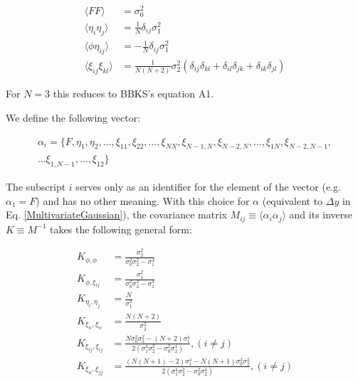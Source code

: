 \documentclass[12pt]{article}
\begin{document}

\begin{equation} \label{corr}
\begin{split}
\langle FF \rangle &= \sigma_0^2 \\
\langle\eta_i\eta_j\rangle &= \frac{1}{N}\delta_{ij}\sigma_1^2 \\
\langle\phi\eta_{ij}\rangle &= -\frac{1}{N}\delta_{ij}\sigma_1^2 \\
\langle\xi_{ij}\xi_{kl}\rangle &= \frac{1}{N(N+2)}\sigma_2^2(\delta_{ij}\delta_{kl}+\delta_{il}\delta_{jk}+\delta_{ik}\delta_{jl})
\end{split}
\end{equation}

\noindent For $N=3$ this reduces to BBKS's equation A1. 

We define the following vector:

\begin{equation}
\begin{split}
\alpha_i = \{F,\eta_1,\eta_2,\ldots,\xi_{11},\xi_{22},\ldots,\xi_{NN},\xi_{N-1,N},\xi_{N-2,N},\ldots,\xi_{1N},\xi_{N-2,N-1},\\
\ldots\xi_{1,N-1},\ldots,\xi_{12}\}
\end{split}
\end{equation}

\noindent The subscript $i$ serves only as an identifier for the element of the vector (e.g. $\alpha_1 = F$) and has no other meaning. With this choice for $\alpha$ (equivalent to $\Delta y$ in Eq. \ref{MultivariateGaussian}), the covariance matrix $M_{ij}\equiv\langle\alpha_i\alpha_j\rangle$ and its inverse $K \equiv M^{-1}$ takes the following general form:

\begin{align*}
K_{\phi, \phi} &= \frac{\sigma_2^2}{\sigma_0^2\sigma_2^2-\sigma_1^4} \\
K_{\phi, \xi_{ij}} &= \frac{\sigma_1^2}{\sigma_0^2\sigma_2^2-\sigma_1^4} \\
K_{\eta_i,\eta_j} &= \frac{N}{\sigma_1^2}\\
K_{\xi_{ii},\xi_{ii}} &=  \frac{N(N+2)}{\sigma_2^2} \\
K_{\xi_{ij}, \xi_{ij}} &= \frac{N\sigma_0^2\sigma_2^2-(N+2)\sigma_1^4}{2(\sigma_1^4\sigma_2^2-\sigma_0^2\sigma_2^4)}, (i\neq j)\\
K_{\xi_{ii}, \xi_{jj}} &= \frac{(N(N+1)-2)\sigma_1^4 - N(N+1)\sigma_0^2\sigma_2^2}{2(\sigma_1^4\sigma_2^2-\sigma_0^2\sigma_2^4)}, (i \neq j)\\
\end{align*}
\end{document}

